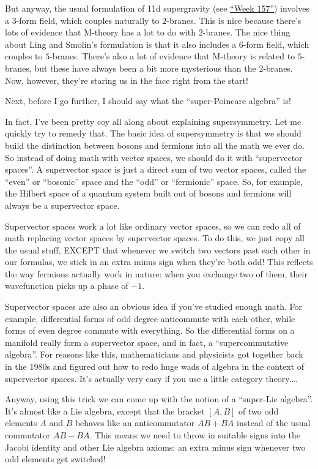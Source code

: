 \documentclass{article}
\begin{document}
But anyway, the usual formulation of 11d supergravity (see
\protect\hyperlink{week157}{``Week 157''}) involves a \(3\)-form field,
which couples naturally to \(2\)-branes. This is nice because there's
lots of evidence that M-theory has a lot to do with \(2\)-branes. The
nice thing about Ling and Smolin's formulation is that it also includes
a \(6\)-form field, which couples to \(5\)-branes. There's also a lot of
evidence that M-theory is related to \(5\)-branes, but these have always
been a bit more mysterious than the \(2\)-branes. Now, however, they're
staring us in the face right from the start!

Next, before I go further, I should say what the ``super-Poincare
algebra'' is!

In fact, I've been pretty coy all along about explaining supersymmetry.
Let me quickly try to remedy that. The basic idea of supersymmetry is
that we should build the distinction between bosons and fermions into
all the math we ever do. So instead of doing math with vector spaces, we
should do it with ``supervector spaces''. A supervector space is just a
direct sum of two vector spaces, called the ``even'' or ``bosonic''
space and the ``odd'' or ``fermionic'' space. So, for example, the
Hilbert space of a quantum system built out of bosons and fermions will
always be a supervector space.

Supervector spaces work a lot like ordinary vector spaces, so we can
redo all of math replacing vector spaces by supervector spaces. To do
this, we just copy all the usual stuff, EXCEPT that whenever we switch
two vectors past each other in our formulas, we stick in an extra minus
sign when they're both odd! This reflects the way fermions actually work
in nature: when you exchange two of them, their wavefunction picks up a
phase of \(-1\).

Supervector spaces are also an obvious idea if you've studied enough
math. For example, differential forms of odd degree anticommute with
each other, while forms of even degree commute with everything. So the
differential forms on a manifold really form a supervector space, and in
fact, a ``supercommutative algebra''. For reasons like this,
mathematicians and physicists got together back in the 1980s and figured
out how to redo huge wads of algebra in the context of supervector
spaces. It's actually very easy if you use a little category
theory\ldots.

Anyway, using this trick we can come up with the notion of a ``super-Lie
algebra''. It's almost like a Lie algebra, except that the bracket
\([A,B]\) of two odd elements \(A\) and \(B\) behaves like an
anticommutator \(AB+BA\) instead of the usual commutator \(AB-BA\). This
means we need to throw in suitable signs into the Jacobi identity and
other Lie algebra axioms: an extra minus sign whenever two odd elements
get switched!
\end{document}
